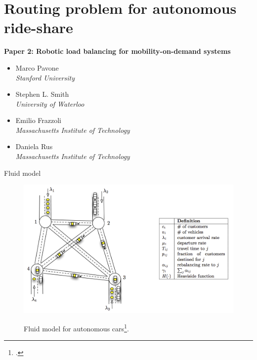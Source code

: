 
\section{Routing problem for autonomous ride-share}

	\begin{frame}
	\textbf{Paper 2: Robotic load balancing for mobility-on-demand systems}
	\begin{itemize}
		\item Marco Pavone \\
		\textit{Stanford University}
		\item Stephen L. Smith \\
		\textit{University of Waterloo}
		\item Emilio Frazzoli \\
		\textit{Massachusetts Institute of Technology}
		\item Daniela Rus \\
		\textit{Massachusetts Institute of Technology}
	\end{itemize}
	\end{frame}

    \begin{frame}{Fluid model}
        \begin{figure}
            \centering
            {\includegraphics[scale=0.28]{plots/fluid_model.png}}
            \caption{Fluid model for autonomous cars\footcite{pavone2012robotic}.}
        \end{figure}
    \end{frame}

